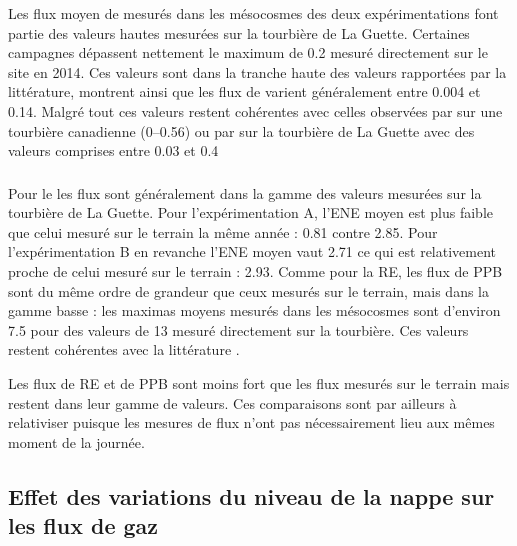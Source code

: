 Les flux moyen de \chh mesurés dans les mésocosmes des deux expérimentations font partie des valeurs hautes mesurées sur la tourbière de La Guette.
Certaines campagnes dépassent nettement le maximum de \SI{0.2}{\uml} mesuré directement sur le site en 2014.
Ces valeurs sont dans la tranche haute des valeurs rapportées par la littérature, \citet{blodau2002} montrent ainsi que les flux de \chh varient généralement entre \num{0.004} et \SI{0.14}{\uml}.
Malgré tout ces valeurs restent cohérentes avec celles observées par \citet{lai2014} sur une tourbière canadienne (\num{0}--\SI{0.56}{\uml}) ou par \citet{gogo2011a} sur la tourbière de La Guette avec des valeurs comprises entre \num{0.03} et \SI{0.4}{\uml}

\subsubsection{\coo}

Pour le \coo les flux sont généralement dans la gamme des valeurs mesurées sur la tourbière de La Guette.
Pour l'expérimentation A, l'ENE moyen est plus faible que celui mesuré sur le terrain la même année : \num{0.81} contre \SI{2.85}{\uml}.
Pour l'expérimentation B en revanche l'ENE moyen vaut \SI{2.71}{\uml} ce qui est relativement proche de celui mesuré sur le terrain : \SI{2.93}{\uml}.
Comme pour la RE, les flux de PPB sont du même ordre de grandeur que ceux mesurés sur le terrain, mais dans la gamme basse : les maximas moyens mesurés dans les mésocosmes sont d'environ \num{7.5} pour des valeurs de \SI{13}{\uml} mesuré directement sur la tourbière.
Ces valeurs restent cohérentes avec la littérature \citep{bortoluzzi2006a} \plop.


Les flux de RE et de PPB sont moins fort que les flux mesurés sur le terrain mais restent dans leur gamme de valeurs.
Ces comparaisons sont par ailleurs à relativiser puisque les mesures de flux n'ont pas nécessairement lieu aux mêmes moment de la journée.



\subsection{Effet des variations du niveau de la nappe sur les flux de gaz}

